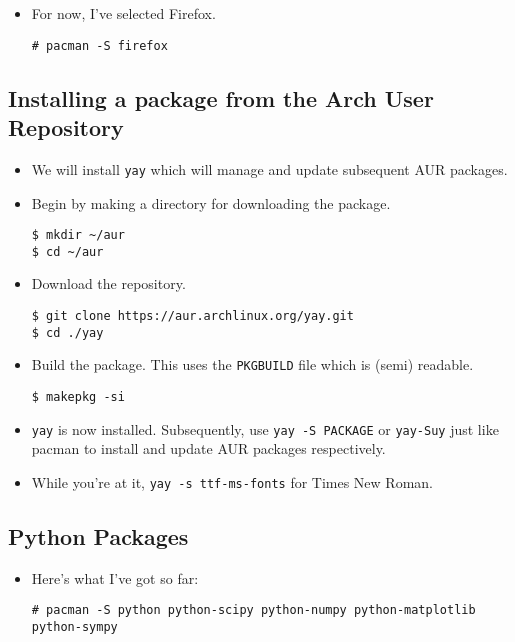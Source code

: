 \documentclass{article}
\begin{document}
  \begin{itemize}
    \item For now, I've selected Firefox.
\begin{verbatim}
# pacman -S firefox
\end{verbatim}
  \end{itemize}

  \subsection{Installing a package from the Arch User Repository}

  \begin{itemize}
    \item We will install \verb|yay| which will manage and update subsequent AUR packages.
    \item Begin by making a directory for downloading the package.
\begin{verbatim}
$ mkdir ~/aur
$ cd ~/aur
\end{verbatim}
    \item Download the repository.
\begin{verbatim}
$ git clone https://aur.archlinux.org/yay.git
$ cd ./yay
\end{verbatim}
    \item Build the package.
      This uses the \verb|PKGBUILD| file which is (semi) readable.
\begin{verbatim}
$ makepkg -si
\end{verbatim}
    \item \verb|yay| is now installed.
      Subsequently, use \verb|yay -S PACKAGE| or \verb|yay-Suy| just like pacman to install and update AUR packages respectively.
    \item While you're at it, \verb|yay -s ttf-ms-fonts| for Times New Roman.
  \end{itemize}

  \subsection{Python Packages}
  \begin{itemize}
    \item Here's what I've got so far:
\begin{verbatim}
# pacman -S python python-scipy python-numpy python-matplotlib python-sympy
\end{verbatim}
  \end{itemize}
\end{document}
